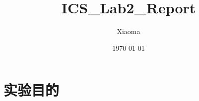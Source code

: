 \documentclass[12pt, a4paper, oneside]{ctexart}
\title{ICS\_Lab2\_Report}
\author{Xiaoma}
\date{\today}
\begin{document}
\maketitle
\section*{实验目的}
\end{document}
